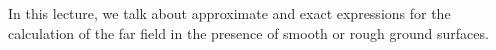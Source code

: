 In this lecture, we talk about approximate and exact expressions for the calculation of the far field in the presence of smooth or rough ground surfaces.




